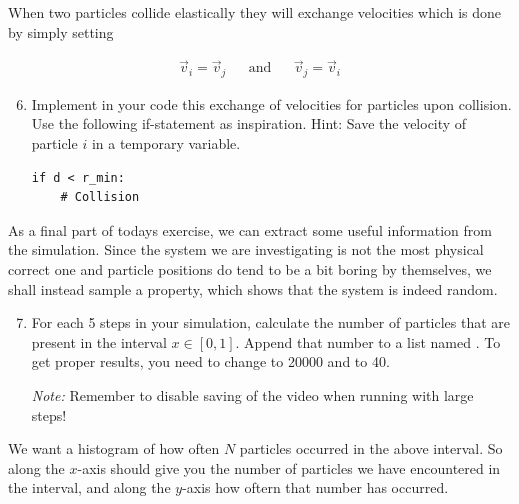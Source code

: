 \documentclass{article}
\begin{document}

When two particles collide elastically they will exchange velocities which is done by simply setting

\begin{align}
  \vec{v}_i = \vec{v}_j & & \text{and} & & \vec{v}_j = \vec{v}_i
\end{align}


\begin{enumerate}
  \setcounter{enumi}{5}
  \item Implement in your code this exchange of velocities for particles upon
    collision. Use the following if-statement as inspiration.
    {Hint:} Save the velocity of particle $i$ in a temporary variable.

\begin{lstlisting}
if d < r_min:
    # Collision
\end{lstlisting}

\end{enumerate}

As a final part of todays exercise, we can extract some useful information from the simulation.
Since the system we are investigating is not the most physical correct one and
particle positions do tend to be a bit boring by themselves, we shall instead
sample a property, which shows that the system is indeed random.

\begin{enumerate}
  \setcounter{enumi}{6}
  \item For each 5 steps in your simulation, calculate the number of particles
    that are present in the interval $x \in [0, 1]$.
    Append that number to a list named .  To get proper results,
    you need to change  to 20000 and  to 40.

    {\em Note:} Remember to disable saving of the video when running with large
    steps!

\end{enumerate}

We want a histogram of how often $N$ particles occurred in the above
interval. So along the $x$-axis should give you the number of particles we have
encountered in the interval, and along the $y$-axis how oftern that number
has occurred.\\
\end{document}
